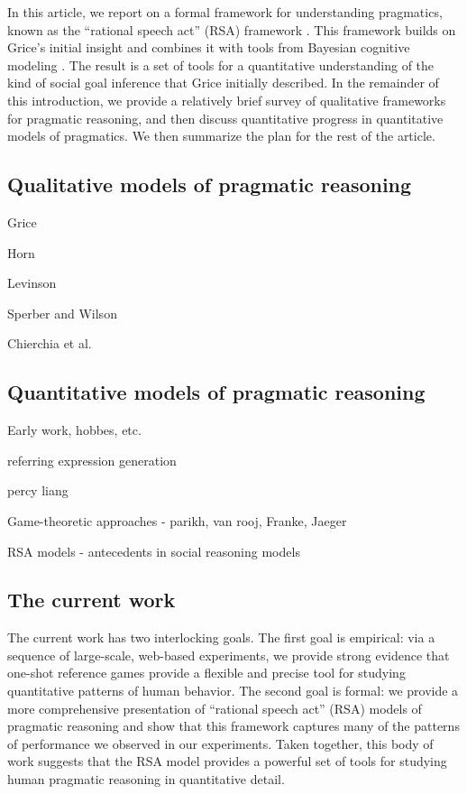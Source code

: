 \documentclass[man,noapacite]{apa2}
\begin{document}
In this article, we report on a formal framework for understanding pragmatics, known as the ``rational speech act'' (RSA) framework \cite<originally introduced in>{frank2012,goodman2013}. This framework builds on Grice's initial insight and combines it with tools from Bayesian cognitive modeling \cite{tenenbaum2011}. The result is a set of tools for a quantitative understanding of the kind of social goal inference that Grice initially described. In the remainder of this introduction, we provide a relatively brief survey of qualitative frameworks for pragmatic reasoning, and then discuss quantitative progress in quantitative models of pragmatics. We then summarize the plan for the rest of the article.

\subsection{Qualitative models of pragmatic reasoning}

Grice

Horn

Levinson

Sperber and Wilson

Chierchia et al.

\subsection{Quantitative models of pragmatic reasoning}

Early work, hobbes, etc.

referring expression generation

percy liang

Game-theoretic approaches - parikh, van rooj, Franke, Jaeger

RSA models - antecedents in social reasoning models \cite{baker2009}

\subsection{The current work}

The current work has two interlocking goals. The first goal is empirical: via a sequence of large-scale, web-based experiments, we provide strong evidence that one-shot reference games provide a flexible and precise tool for studying quantitative patterns of human behavior. The second goal is formal: we provide a more comprehensive presentation of ``rational speech act'' (RSA) models of pragmatic reasoning and show that this framework captures many of the patterns of performance we observed in our experiments. Taken together, this body of work suggests that the RSA model provides a powerful set of tools for studying human pragmatic reasoning in quantitative detail.
\end{document}
